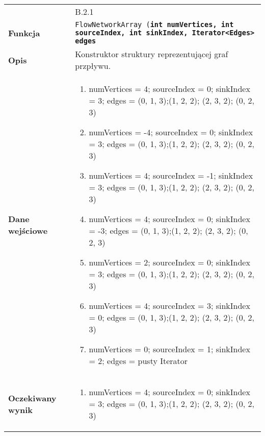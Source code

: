 \begin{center}
\begin{tabular}{@{} >{\ttfamily}p{} @{\hspace{0.02\textwidth}} p{} @{}}
    \toprule
    \multicolumn{2}{@{}c@{}}{\bfseries{NetworkConstructorTest}} \\ 
    \midrule
    {\bfseries Id} & B.2.1 \\
    \hline
    {\bfseries Funkcja} & \texttt{FlowNetworkArray (\bfseries int numVertices, \bfseries int sourceIndex, 
                                                    \bfseries int sinkIndex,
                                                    \bfseries Iterator<Edges> edges} \\
    \hline
    {\bfseries Opis} & Konstruktor struktury reprezentującej graf przpływu. \\
    \hline
    {\bfseries Dane wejściowe} & {\begin{enumerate} 
                                        \item numVertices = 4; sourceIndex = 0; sinkIndex = 3;  edges =  (0, 1, 3);(1, 2, 2); (2, 3, 2); (0, 2, 3)
                                        \item numVertices = -4; sourceIndex = 0; sinkIndex = 3; edges =  (0, 1, 3);(1, 2, 2); (2, 3, 2); (0, 2, 3)
                                        \item numVertices = 4; sourceIndex = -1; sinkIndex = 3; edges =  (0, 1, 3);(1, 2, 2); (2, 3, 2); (0, 2, 3)
                                        \item numVertices = 4; sourceIndex = 0; sinkIndex = -3; edges =  (0, 1, 3);(1, 2, 2); (2, 3, 2); (0, 2, 3)
                                        \item numVertices = 2; sourceIndex = 0; sinkIndex = 3; edges =  (0, 1, 3);(1, 2, 2); (2, 3, 2); (0, 2, 3)
                                        \item numVertices = 4; sourceIndex = 3; sinkIndex = 0; edges =  (0, 1, 3);(1, 2, 2); (2, 3, 2); (0, 2, 3)
                                        \item numVertices = 0; sourceIndex = 1; sinkIndex = 2; edges =  pusty Iterator
                                    \end{enumerate}} \\
    \hline
    {\bfseries Oczekiwany wynik} & {\begin{enumerate} 
                                        \item numVertices = 4; sourceIndex = 0; sinkIndex = 3;  edges =  (0, 1, 3);(1, 2, 2); (2, 3, 2); (0, 2, 3)

\end{enumerate}}
\end{tabular}
\end{center}
